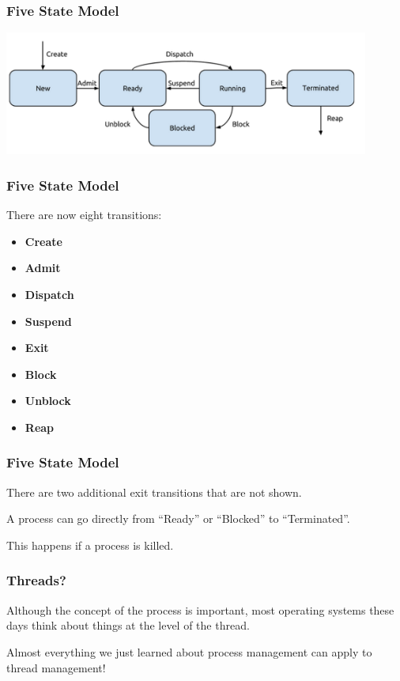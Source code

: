 \begin{frame}
	\frametitle{Five State Model}

	\begin{center}
		\includegraphics[width=0.9\textwidth]{images/5-state-model.png}
	\end{center}

\end{frame}

\begin{frame}
	\frametitle{Five State Model}

	There are now eight transitions:

	\begin{itemize}
		\item \textbf{Create}
		\item \textbf{Admit}
		\item \textbf{Dispatch}
		\item \textbf{Suspend}
		\item \textbf{Exit}
		\item \textbf{Block}
		\item \textbf{Unblock}
		\item \textbf{Reap}
	\end{itemize}

\end{frame}

\begin{frame}
	\frametitle{Five State Model}

	There are two additional exit transitions that are not shown.

	A process can go directly from ``Ready'' or ``Blocked'' to ``Terminated''.

	This happens if a process is killed.

\end{frame}


\begin{frame}
\frametitle{Threads?}

	Although the concept of the process is important, most operating systems these days think about things at the level of the thread. 

	Almost everything we just learned about process management can apply to thread management!

\end{frame}




